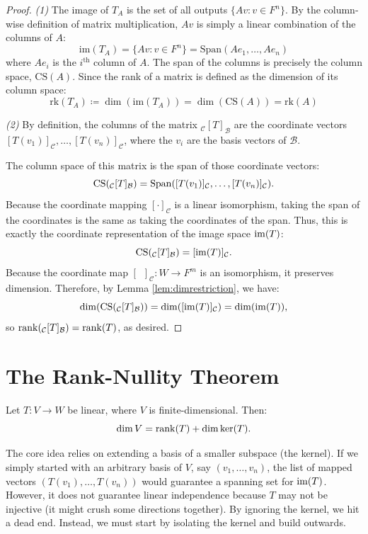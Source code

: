 \documentclass[../linear_algebra_and_groups.tex]{subfiles}
\begin{document}
\begin{proof}
    \textit{(1)} The image of $T_A$ is the set of all outputs $\{Av : v\in F^n\}$. By the column-wise definition of matrix multiplication, $Av$ is simply a linear combination of the columns of $A$:
    \[ \mathrm{im}(T_A) = \{Av : v\in F^n\} = \mathrm{Span}(A e_1, \dots, A e_n) \]
    where $A e_i$ is the $i^{\mathrm{th}}$ column of $A$. The span of the columns is precisely the column space, $\mathrm{CS}(A)$. Since the rank of a matrix is defined as the dimension of its column space:
    \[ \mathrm{rk}(T_A) \coloneqq \dim(\mathrm{im}(T_A)) = \dim(\mathrm{CS}(A)) = \mathrm{rk}(A) \]
    
    \textit{(2)} By definition, the columns of the matrix ${}_\mathcal{C}[T]_\mathcal{B}$ are the coordinate vectors $[T(v_1)]_\mathcal{C}, \dots, [T(v_n)]_\mathcal{C}$, where the $v_i$ are the basis vectors of $\mathcal{B}$.
    
    The column space of this matrix is the span of those coordinate vectors:
    \[ \mathrm{CS}({}_\mathcal{C}[T]_\mathcal{B}) = \operatorname{Span}([T(v_1)]_\mathcal{C}, \dots, [T(v_n)]_\mathcal{C}). \]
    Because the coordinate mapping $[\cdot]_\mathcal{C}$ is a linear isomorphism, taking the span of the coordinates is the same as taking the coordinates of the span. Thus, this is exactly the coordinate representation of the image space $\operatorname{im}(T)$:
    \[ \operatorname{CS}({}_\mathcal{C}[T]_\mathcal{B}) = [\operatorname{im}(T)]_\mathcal{C}. \]
    Because the coordinate map $[\phantom{v}]_\mathcal{C} : W \to F^m$ is an isomorphism, it preserves dimension. Therefore, by Lemma \ref{lem:dimrestriction}, we have:
    \[ \dim(\operatorname{CS}({}_\mathcal{C}[T]_\mathcal{B})) = \dim([\operatorname{im}(T)]_\mathcal{C}) = \dim(\operatorname{im}(T)), \]
    so $\operatorname{rank}({}_\mathcal{C}[T]_\mathcal{B}) = \operatorname{rank}(T)$, as desired.\qedhere
\end{proof}

\section{The Rank-Nullity Theorem}

\begin{theorem}
    \begin{shaded*}
        Let $T:V\to W$ be linear, where $V$ is finite-dimensional. Then:
        \[ \dim V = \operatorname{rank}(T) + \dim \ker(T). \]
    \end{shaded*}
\end{theorem}

\begin{remark}
    The core idea relies on extending a basis of a smaller subspace (the kernel). If we simply started with an arbitrary basis of $V$, say $(v_1,\dots,v_n)$, the list of mapped vectors $(T(v_1),\dots,T(v_n))$ would guarantee a spanning set for $\operatorname{im}(T)$. However, it does not guarantee linear independence because $T$ may not be injective (it might crush some directions together). By ignoring the kernel, we hit a dead end. Instead, we must start by isolating the kernel and build outwards.
\end{remark}
\end{document}

